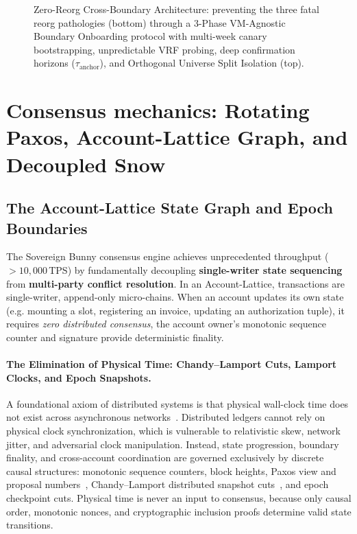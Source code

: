 \documentclass[a4paper,11pt,twoside,parskip=half-,headings=small]{scrartcl}
\begin{document}
\begin{figure}[H]
{%
}
\caption{Zero-Reorg Cross-Boundary Architecture: preventing the three fatal reorg pathologies (bottom) through a 3-Phase VM-Agnostic Boundary Onboarding protocol with multi-week canary bootstrapping, unpredictable VRF probing, deep confirmation horizons ($\tau_{\text{anchor}}$), and Orthogonal Universe Split Isolation (top).}
\label{fig:reorg_vs_onboarding}
\end{figure}


\section{Consensus mechanics: Rotating Paxos, Account-Lattice Graph, and Decoupled Snow}
\label{sec:consensus}

\subsection{The Account-Lattice State Graph and Epoch Boundaries}

The Sovereign Bunny consensus engine achieves unprecedented throughput ($>10{,}000$\,TPS)
by fundamentally decoupling \textbf{single-writer state sequencing} from \textbf{multi-party conflict resolution}.
In an Account-Lattice, transactions are single-writer, append-only micro-chains. When an account
updates its own state (e.g. mounting a slot, registering an invoice, updating an authorization tuple),
it requires \emph{zero distributed consensus}, the account owner's monotonic sequence counter
and signature provide deterministic finality.

\paragraph{The Elimination of Physical Time: Chandy--Lamport Cuts, Lamport Clocks, and Epoch Snapshots.}
A foundational axiom of distributed systems is that physical wall-clock time does not exist across asynchronous networks~\cite{lamport1978time}. Distributed ledgers cannot rely on physical clock synchronization, which is vulnerable to relativistic skew, network jitter, and adversarial clock manipulation. Instead, state progression, boundary finality, and cross-account coordination are governed exclusively by discrete causal structures: monotonic sequence counters, block heights, Paxos view and proposal numbers~\cite{lamport1998paxos}, Chandy--Lamport distributed snapshot cuts~\cite{chandylamport1985}, and epoch checkpoint cuts. Physical time is never an input to consensus, because only causal order, monotonic nonces, and cryptographic inclusion proofs determine valid state transitions.
\end{document}
